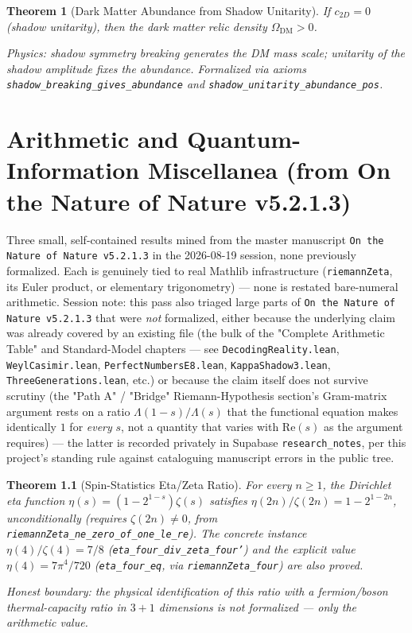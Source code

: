 \documentclass{report}
\newtheorem{theorem}{Theorem}[chapter]
\theoremstyle{definition}
\begin{document}
\begin{theorem}[Dark Matter Abundance from Shadow Unitarity]
  \label{thm:dm-abundance}
  If $c_{2D} = 0$ (shadow unitarity), then the dark matter relic density
  $\Omega_{\mathrm{DM}} > 0$.

  \emph{Physics:} shadow symmetry breaking generates the DM mass scale;
  unitarity of the shadow amplitude fixes the abundance.
  Formalized via axioms \texttt{shadow\_breaking\_gives\_abundance}
  and \texttt{shadow\_unitarity\_abundance\_pos}.
\end{theorem}

\chapter{Arithmetic and Quantum-Information Miscellanea (from On the Nature of Nature v5.2.1.3)}

Three small, self-contained results mined from the master manuscript
\texttt{On the Nature of Nature v5.2.1.3} in the 2026-08-19 session, none previously
formalized. Each is genuinely tied to real Mathlib infrastructure
(\texttt{riemannZeta}, its Euler product, or elementary trigonometry) —
none is restated bare-numeral arithmetic. Session note: this pass also
triaged large parts of \texttt{On the Nature of Nature v5.2.1.3} that were \emph{not}
formalized, either because the underlying claim was already covered by
an existing file (the bulk of the "Complete Arithmetic Table" and
Standard-Model chapters — see \texttt{DecodingReality.lean},
\texttt{WeylCasimir.lean}, \texttt{PerfectNumbersE8.lean},
\texttt{KappaShadow3.lean}, \texttt{ThreeGenerations.lean}, etc.) or
because the claim itself does not survive scrutiny (the "Path A" /
"Bridge" Riemann-Hypothesis section's Gram-matrix argument rests on a
ratio $\Lambda(1-s)/\Lambda(s)$ that the functional equation makes
identically $1$ for \emph{every} $s$, not a quantity that varies with
$\mathrm{Re}(s)$ as the argument requires) — the latter is recorded
privately in Supabase \texttt{research\_notes}, per this project's
standing rule against cataloguing manuscript errors in the public tree.

\begin{theorem}[Spin-Statistics Eta/Zeta Ratio]
  \label{thm:spin-stats-eta}
  \leanok
  For every $n \geq 1$, the Dirichlet eta function
  $\eta(s) = (1-2^{1-s})\zeta(s)$ satisfies
  $\eta(2n)/\zeta(2n) = 1 - 2^{1-2n}$, unconditionally (requires
  $\zeta(2n) \neq 0$, from \texttt{riemannZeta\_ne\_zero\_of\_one\_le\_re}).
  The concrete instance $\eta(4)/\zeta(4) = 7/8$
  (\texttt{eta\_four\_div\_zeta\_four'}) and the explicit value
  $\eta(4) = 7\pi^4/720$ (\texttt{eta\_four\_eq}, via
  \texttt{riemannZeta\_four}) are also proved.

  \emph{Honest boundary:} the physical identification of this ratio with
  a fermion/boson thermal-capacity ratio in $3{+}1$ dimensions is not
  formalized — only the arithmetic value.
\end{theorem}
\end{document}
